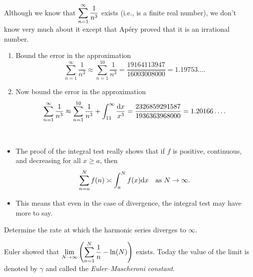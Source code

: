 \begin{example}
Although we know that $\displaystyle\sum_{n=1}^\infty\frac{1}{n^3}$ exists (i.e., is a finite real number), we don't know very much about it except that Ap\'ery proved that it is an irrational number.
\begin{enumerate}
\item Bound the error in the approximation
\begin{equation*}
\sum_{n=1}^\infty\frac{1}{n^3} \approx \sum_{n=1}^{10}\frac{1}{n^3} = \frac{19164113947}{16003008000} = 1.19753\dots.
\end{equation*}
\vfill
\item  Now bound the error in the approximation
\begin{equation*}
\sum_{n=1}^{\infty}\frac{1}{n^3}\approx \sum_{n=1}^{10}\frac{1}{n^3} + \int_{11}^\infty\frac{\mathrm{d} x}{x^3} =  \frac{2326859291587}{1936363968000} = 1.20166\dots.
\end{equation*}
\vfill
\end{enumerate}
\end{example}

\newpage

\begin{remark}\,
\begin{itemize}
\item The proof of the integral test really shows that if $f$ is positive, continuous, and decreasing for all $x\ge a$, then
\begin{equation*}
\sum_{n=a}^N f(n) \asymp \int_a^N f(x)\mathrm{d} x\quad \text{as }N\to\infty.
\end{equation*}
\item This means that even in the case of divergence, the integral test may have more to say.
\end{itemize}
\end{remark}
\begin{example}
Determine the rate at which the harmonic series diverges to $\infty$.
\end{example}

\vfill

\begin{remark}
Euler showed that $\displaystyle\lim_{N\to \infty}\left(\sum_{n=1}^N\frac{1}{n} - \ln(N)\right)$ exists.
Today the value of the limit is denoted by $\gamma$ and called the \textit{Euler--Mascheroni constant}.
\end{remark}
